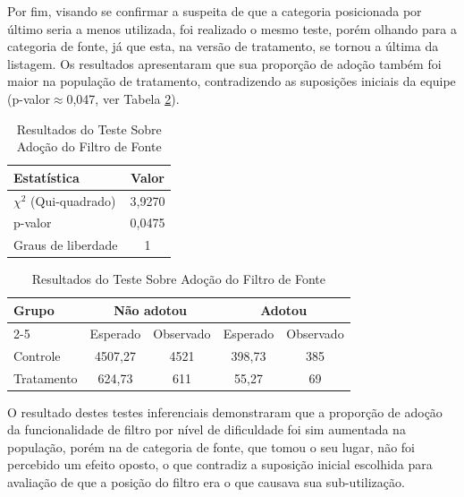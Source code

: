 Por fim, visando se confirmar a suspeita de que a categoria posicionada por último seria a menos utilizada, foi realizado o mesmo teste, porém olhando para a categoria de fonte, já que esta, na versão de tratamento, se tornou a última da listagem. Os resultados apresentaram que sua proporção de adoção também foi maior na população de tratamento, contradizendo as suposições iniciais da equipe (p-valor$\approx $0,047, ver Tabela \ref{tab:exp-adocao-fonte}).

\begin{table}[h]
    \centering
    \caption{Resultados do Teste Sobre Adoção do Filtro de Fonte}
    \label{tab:exp-adocao-fonte}

    \begin{tabular}{lc}
        \hline
        \textbf{Estatística} & \textbf{Valor} \\ \hline
        $\chi^2$ (Qui-quadrado) & 3,9270 \\
        p-valor & 0,0475 \\  
        Graus de liberdade & 1 \\ \hline
    \end{tabular}

    \vspace{0.5cm} %

    \begin{tabular}{lcccc}
        \hline
        \multirow{2}{*}{\textbf{Grupo}} & \multicolumn{2}{c}{\textbf{Não adotou}} & \multicolumn{2}{c}{\textbf{Adotou}} \\ 
        \cline{2-5}
        & Esperado & Observado & Esperado & Observado \\ \hline
        Controle & 4507,27 & 4521 & 398,73 & 385 \\
        Tratamento & 624,73 & 611 & 55,27 & 69 \\ \hline
    \end{tabular}

    \begin{center}
    \end{center}

\end{table}



O resultado destes testes inferenciais demonstraram que a proporção de adoção da funcionalidade de filtro por nível de dificuldade foi sim aumentada na população, porém na de categoria de fonte, que tomou o seu lugar, não foi percebido um efeito oposto, o que contradiz a suposição inicial escolhida para avaliação de que a posição do filtro era o que causava sua sub-utilização.

